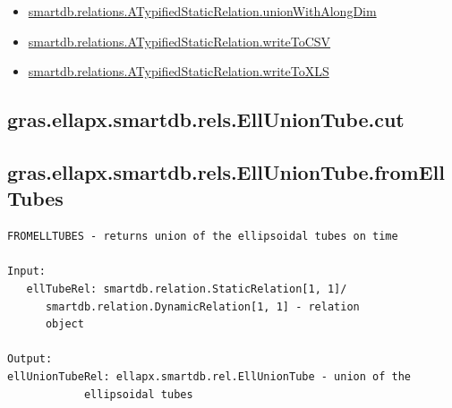 \documentclass[letterpaper,10pt,english]{sphinxmanual}
\begin{document}
\begin{itemize}
\item {} 
{\hyperref[chap_functions:smartdb-relations-atypifiedstaticrelation-unionwithalongdim]{smartdb.relations.ATypifiedStaticRelation.unionWithAlongDim}}

\item {} 
{\hyperref[chap_functions:smartdb-relations-atypifiedstaticrelation-writetocsv]{smartdb.relations.ATypifiedStaticRelation.writeToCSV}}

\item {} 
{\hyperref[chap_functions:smartdb-relations-atypifiedstaticrelation-writetoxls]{smartdb.relations.ATypifiedStaticRelation.writeToXLS}}

\end{itemize}


\subsection{gras.ellapx.smartdb.rels.EllUnionTube.cut}
\label{chap_functions:gras-ellapx-smartdb-rels-elluniontube-cut}

\subsection{gras.ellapx.smartdb.rels.EllUnionTube.fromEllTubes}
\label{chap_functions:gras-ellapx-smartdb-rels-elluniontube-fromelltubes}
\begin{Verbatim}[commandchars=\\\{\}]
FROMELLTUBES - returns union of the ellipsoidal tubes on time

Input:
   ellTubeRel: smartdb.relation.StaticRelation[1, 1]/
      smartdb.relation.DynamicRelation[1, 1] - relation
      object

Output:
ellUnionTubeRel: ellapx.smartdb.rel.EllUnionTube - union of the
            ellipsoidal tubes
\end{Verbatim}
\end{document}
